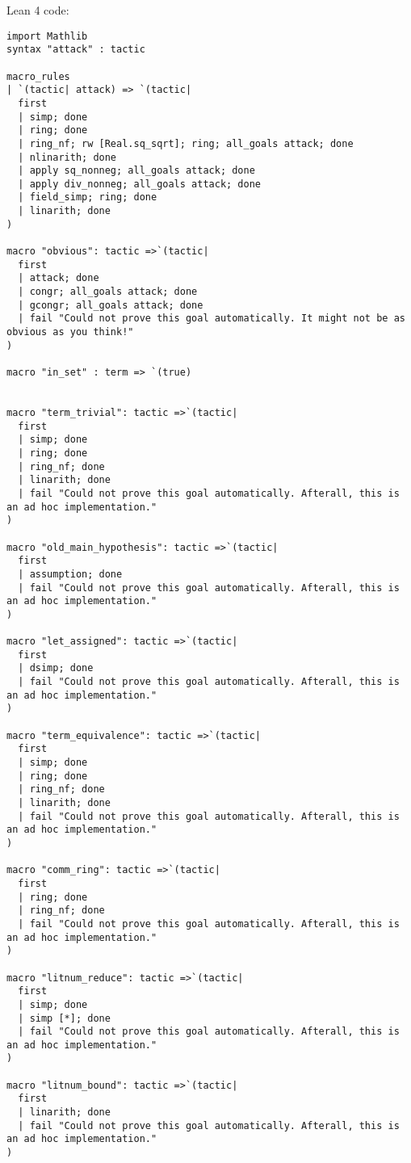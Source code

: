 \documentclass{article}
\begin{document}
Lean 4 code:
\begin{tcolorbox}[colback=white!10, width=\linewidth]
\begin{lstlisting}[language=Lean4]
import Mathlib
syntax "attack" : tactic

macro_rules
| `(tactic| attack) => `(tactic|
  first
  | simp; done
  | ring; done
  | ring_nf; rw [Real.sq_sqrt]; ring; all_goals attack; done
  | nlinarith; done
  | apply sq_nonneg; all_goals attack; done
  | apply div_nonneg; all_goals attack; done
  | field_simp; ring; done
  | linarith; done
)

macro "obvious": tactic =>`(tactic|
  first
  | attack; done
  | congr; all_goals attack; done
  | gcongr; all_goals attack; done
  | fail "Could not prove this goal automatically. It might not be as obvious as you think!"
)

macro "in_set" : term => `(true)


macro "term_trivial": tactic =>`(tactic|
  first
  | simp; done
  | ring; done
  | ring_nf; done
  | linarith; done
  | fail "Could not prove this goal automatically. Afterall, this is an ad hoc implementation."
)

macro "old_main_hypothesis": tactic =>`(tactic|
  first
  | assumption; done
  | fail "Could not prove this goal automatically. Afterall, this is an ad hoc implementation."
)

macro "let_assigned": tactic =>`(tactic|
  first
  | dsimp; done
  | fail "Could not prove this goal automatically. Afterall, this is an ad hoc implementation."
)

macro "term_equivalence": tactic =>`(tactic|
  first
  | simp; done
  | ring; done
  | ring_nf; done
  | linarith; done
  | fail "Could not prove this goal automatically. Afterall, this is an ad hoc implementation."
)

macro "comm_ring": tactic =>`(tactic|
  first
  | ring; done
  | ring_nf; done
  | fail "Could not prove this goal automatically. Afterall, this is an ad hoc implementation."
)

macro "litnum_reduce": tactic =>`(tactic|
  first
  | simp; done
  | simp [*]; done
  | fail "Could not prove this goal automatically. Afterall, this is an ad hoc implementation."
)

macro "litnum_bound": tactic =>`(tactic|
  first
  | linarith; done
  | fail "Could not prove this goal automatically. Afterall, this is an ad hoc implementation."
)


\end{lstlisting}
\end{tcolorbox}
\end{document}
